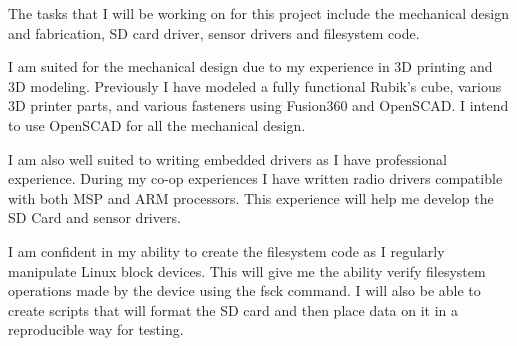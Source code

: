 The tasks that I will be working on for this project include the mechanical
design and fabrication, SD card driver, sensor drivers and filesystem code.

I am suited for the mechanical design due to my experience in 3D printing and
3D modeling.  Previously I have modeled a fully functional Rubik's cube,
various 3D printer parts, and various fasteners using Fusion360 and OpenSCAD.
I intend to use OpenSCAD for all the mechanical design.

I am also well suited to writing embedded drivers as I have professional
experience.  During my co-op experiences I have written radio drivers
compatible with both MSP and ARM processors.  This experience will help me
develop the SD Card and sensor drivers.

I am confident in my ability to create the filesystem code as I regularly
manipulate Linux block devices.  This will give me the ability verify
filesystem operations made by the device using the fsck command.  I will also
be able to create scripts that will format the SD card and then place data on
it in a reproducible way for testing.
